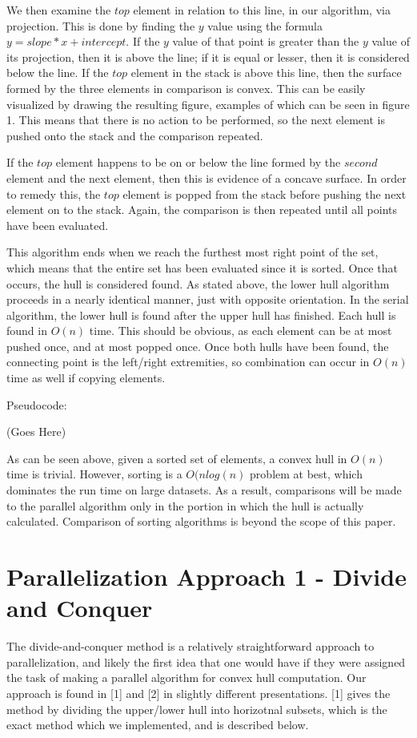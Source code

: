 \documentclass[conference]{IEEEtran}
\begin{document}
We then examine the $top$ element in relation to this line, in our algorithm, via projection. This is done by finding the $y$ value using the formula $y = slope * x + intercept$. If the $y$ value of that point is greater than the $y$ value of its projection, then it is above the line; if it is equal or lesser, then it is considered below the line. If the $top$ element in the stack is above this line, then the surface formed by the three elements in comparison is convex. This can be easily visualized by drawing the resulting figure, examples of which can be seen in figure 1. This means that there is no action to be performed, so the next element is pushed onto the stack and the comparison repeated.

If the $top$ element happens to be on or below the line formed by the $second$ element and the next element, then this is evidence of a concave surface. In order to remedy this, the $top$ element is popped from the stack before pushing the next element on to the stack. Again, the comparison is then repeated until all points have been evaluated.

This algorithm ends when we reach the furthest most right point of the set, which means that the entire set has been evaluated since it is sorted. Once that occurs, the hull is considered found. As stated above, the lower hull algorithm proceeds in a nearly identical manner, just with opposite orientation. In the serial algorithm, the lower hull is found after the upper hull has finished. Each hull is found in $O(n)$ time. This should be obvious, as each element can be at most pushed once, and at most popped once. Once both hulls have been found, the connecting point is the left/right extremities, so combination can occur in $O(n)$ time as well if copying elements.

Pseudocode:

(Goes Here)

As can be seen above, given a sorted set of elements, a convex hull in $O(n)$ time is trivial. However, sorting is a $O(nlog(n)$ problem at best, which dominates the run time on large datasets. As a result, comparisons will be made to the parallel algorithm only in the portion in which the hull is actually calculated. Comparison of sorting algorithms is beyond the scope of this paper.

\section{Parallelization Approach 1 - Divide and Conquer}
The divide-and-conquer method is a relatively straightforward approach to parallelization, and likely the first idea that one would have if they were assigned the task of making a parallel algorithm for convex hull computation. Our approach is found in [1] and [2] in slightly different presentations. [1] gives the method by dividing the upper/lower hull into horizotnal subsets, which is the exact method which we implemented, and is described below. 
\end{document}
